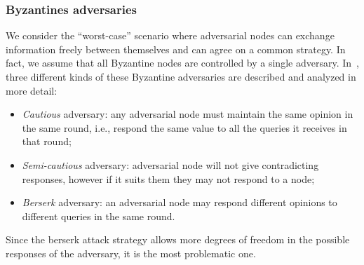 \documentclass[../main.tex]{subfiles}
\begin{document}
\subsubsection{Byzantines adversaries}
We consider the ``worst-case'' scenario where adversarial nodes can exchange information freely between themselves and can agree on a common strategy. In fact, we assume that all Byzantine nodes are controlled by a single  adversary.  In~\cite{popov2019}, three different kinds of these Byzantine adversaries are described and analyzed in more detail:%
\begin{itemize}
\item \emph{Cautious} adversary: any adversarial node must maintain the same opinion in the same round, i.e., respond the same value to all the queries it receives in that round;
\item \emph{Semi-cautious} adversary: adversarial node will not give contradicting responses, however if it suits them they may not respond to a node;%
\item \emph{Berserk} adversary: an adversarial node may respond different opinions to different queries in the same round.
\end{itemize}



Since the berserk attack strategy allows more degrees of freedom in the possible responses of the adversary, it is the most problematic one.
\end{document}
